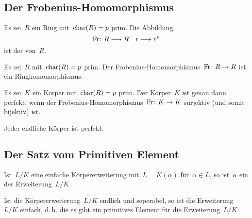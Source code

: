 \subsection{Der Frobenius-Homomorphismus}

\begin{definition}
  Es sei~$R$ ein Ring mit~$\operatorname{char}(R) = p$ prim.
  Die Abbildung
  \[
    \Fr
    \colon
    R \to R
    \quad
    r \mapsto r^p
  \]
  ist der  von~$R$.
\end{definition}

\begin{lemma}
  Es sei~$R$ mit~$\operatorname{char}(R) = p$ prim.
  Der Frobenius-\hspace{0pt}Homomorphismus~$\Fr \colon R \to R$ ist ein Ringhomomorphismus.
\end{lemma}

\begin{proposition}
  Es sei~$K$ ein Körper mit~$\operatorname{char}(R) = p$ prim.
  Der Körper~$K$ ist genau dann perfekt, wenn der Frobenius-Homomorphismus~$\Fr \colon K \to K$ surjektiv (und somit bijektiv) ist. 
\end{proposition}

\begin{corollary}
  Jeder endliche Körper ist perfekt.
\end{corollary}



\subsection{Der Satz vom Primitiven Element}

\begin{definition}
  Ist~$L/K$ eine einfache Körpererweiterung mit~$L = K(\alpha)$ für~$\alpha \in L$, so ist~$\alpha$ ein  der Erweiterung~$L/K$.
\end{definition}

\begin{theorem}
  Ist die Körpererweiterung~$L/K$ endlich und seperabel, so ist die Erweiterung~$L/K$ einfach, d.\,h. die es gibt ein primitives Element für die Erweiterung~$L/K$.
\end{theorem}





\clearpage





